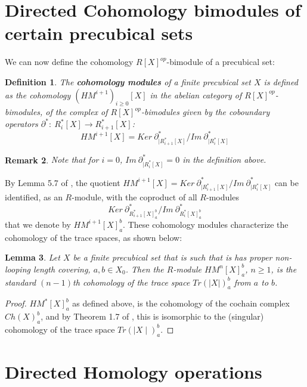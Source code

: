 \documentclass{article}
\newtheorem{definition}{Definition}[section]
\newtheorem{lemma}[definition]{Lemma} %
\newtheorem{remark}[definition]{Remark} %
\newcommand\look[1]{{\bf #1}}
\begin{document}
\section{Directed Cohomology bimodules of certain precubical sets}

\label{sec:precubcohomology}

We can now define the cohomology $R[X]^{op}$-bimodule of a precubical set:

\begin{definition}
\label{def:cohomology}
The \look{cohomology modules} of a finite precubical set $X$ is defined as the cohomology $(HM^{i+1})_{i\geq 0}[X]$ in the abelian category of $R[X]^{op}$-bimodules, of the complex of $R[X]^{op}$-bimodules %
given by the coboundary operators $\partial^*: \ R_i^*[X]\rightarrow R_{i+1}^*[X]$: 
$$
HM^{i+1}[X]=Ker \ \partial^*_{\mid R^*_{i+1}[X]}/Im \ \partial^*_{\mid R^*_{i}[X]}
$$
\end{definition}

\begin{remark}
Note that for $i=0$, $Im \ \partial^*_{| R^*_i[X]}=0$ in the definition above. 
\end{remark}

By Lemma 5.7 of \cite{directedpersistencemodule}, 
the quotient 
$HM^{i+1}[X]=Ker \ \partial^*_{\mid R^*_{i+1}[X]}/Im \ \partial^*_{\mid R^*_{i}[X]}$ can be identified, as an $R$-module, with the coproduct of all $R$-modules  
$$Ker \ \partial^*_{R^*_{i+1}[X]_a^b}/Im \ \partial^*_{R^*_{i}[X]_a^b}$$ 
\noindent that we denote by $HM^{i+1}[X]^b_a$. 
These cohomology modules characterize the cohomology of the trace spaces, as shown below: 

\begin{lemma}
\label{lem:homtrace}
Let $X$ be a finite precubical set
that is such that is has proper non-looping length covering, $a, b \in X_0$. Then
the $R$-module $HM^n[X]^b_a$, $n \geq 1$, is the standard $(n-1)$th cohomology of the trace space $Tr(| X |)^b_a$ from $a$ to $b$. 
\end{lemma}

\begin{proof}
$HM^*[X]_a^b$ as defined above, is the cohomology of the cochain complex $Ch(X)^b_a$, and by Theorem 1.7 of \cite{cubechains}, this is isomorphic to the (singular) cohomology of the trace space $Tr(\mid X \mid)^b_a$.
\end{proof}

\section{Directed Homology operations}
\end{document}
